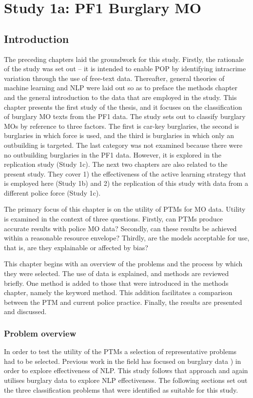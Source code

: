 \chapter{Study 1a: PF1 Burglary MO}
\section{Introduction}

The preceding chapters laid the groundwork for this study. Firstly, the rationale of the study was set out – it is intended to enable POP by identifying intracrime variation through the use of free-text data. Thereafter, general theories of machine learning and NLP were laid out so as to preface the methods chapter and the general introduction to the data that are employed in the study. This chapter presents the first study of the thesis, and it focuses on the classification of burglary MO texts from the PF1 data. The study sets out to classify burglary MOs by reference to three factors. The first is car-key burglaries, the second is burglaries in which force is used, and the third is burglaries in which only an outbuilding is targeted. The last category was not examined because there were no outbuilding burglaries in the PF1 data. However, it is explored in the replication study (Study 1c). The next two chapters are also related to the present study. They cover 1) the effectiveness of the active learning strategy that is employed here (Study 1b) and 2) the replication of this study with data from a different police force (Study 1c).

The primary focus of this chapter is on the utility of PTMs for MO data. Utility is examined in the context of three questions. Firstly, can PTMs produce accurate results with police MO data? Secondly, can these results be achieved within a reasonable resource envelope? Thirdly, are the models acceptable for use, that is,  are they explainable or affected by bias?

This chapter begins with an overview of the problems and the process by which they were selected. The use of data is explained, and methods are reviewed briefly. One method is added to those that were introduced in the methods chapter, namely the keyword method. This addition facilitates a comparison between the PTM and current police practice. Finally, the results are presented and discussed.

\subsection{Problem overview} In order to test the utility of the PTMs a selection of representative problems had to be selected. Previous work in the field has focused on burglary data  \parencite{birks, sheard2020developing } ) in order to explore effectiveness of NLP. This study follows that approach and again utilises burglary data to explore NLP effectiveness. The following sections set out the three classification problems that were identified as suitable for this study.

